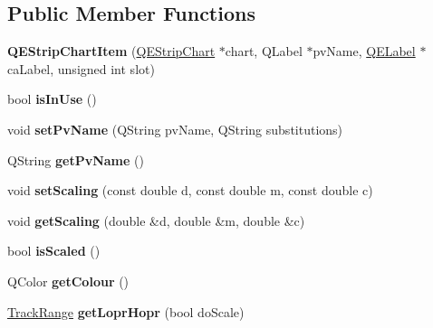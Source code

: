 \subsection*{Public Member Functions}
\begin{DoxyCompactItemize}
\item 
\hypertarget{classQEStripChartItem_a28b3298a32a796e0717122c835b5c578}{
{\bfseries QEStripChartItem} (\hyperlink{classQEStripChart}{QEStripChart} $\ast$chart, QLabel $\ast$pvName, \hyperlink{classQELabel}{QELabel} $\ast$caLabel, unsigned int slot)}
\label{classQEStripChartItem_a28b3298a32a796e0717122c835b5c578}

\item 
\hypertarget{classQEStripChartItem_a583f60c140a2e99ef84da0b0e0825c42}{
bool {\bfseries isInUse} ()}
\label{classQEStripChartItem_a583f60c140a2e99ef84da0b0e0825c42}

\item 
\hypertarget{classQEStripChartItem_a1a35a1c7f0365287dd42d01487441082}{
void {\bfseries setPvName} (QString pvName, QString substitutions)}
\label{classQEStripChartItem_a1a35a1c7f0365287dd42d01487441082}

\item 
\hypertarget{classQEStripChartItem_add3e39a333cb00d9a45555259be919f9}{
QString {\bfseries getPvName} ()}
\label{classQEStripChartItem_add3e39a333cb00d9a45555259be919f9}

\item 
\hypertarget{classQEStripChartItem_aeb0dbf6f27f409797238da86a7ceb135}{
void {\bfseries setScaling} (const double d, const double m, const double c)}
\label{classQEStripChartItem_aeb0dbf6f27f409797238da86a7ceb135}

\item 
\hypertarget{classQEStripChartItem_a2f8b23772fd06eba16873e06ad4236d9}{
void {\bfseries getScaling} (double \&d, double \&m, double \&c)}
\label{classQEStripChartItem_a2f8b23772fd06eba16873e06ad4236d9}

\item 
\hypertarget{classQEStripChartItem_a99554cafbada6a8cf3727f1aa74ef4a5}{
bool {\bfseries isScaled} ()}
\label{classQEStripChartItem_a99554cafbada6a8cf3727f1aa74ef4a5}

\item 
\hypertarget{classQEStripChartItem_a0b506d97e50a6ea0fb899389591c4e82}{
QColor {\bfseries getColour} ()}
\label{classQEStripChartItem_a0b506d97e50a6ea0fb899389591c4e82}

\item 
\hypertarget{classQEStripChartItem_ad29db984dbee09466cef74c8674801fd}{
\hyperlink{classTrackRange}{TrackRange} {\bfseries getLoprHopr} (bool doScale)}
\label{classQEStripChartItem_ad29db984dbee09466cef74c8674801fd}


\end{DoxyCompactItemize}
